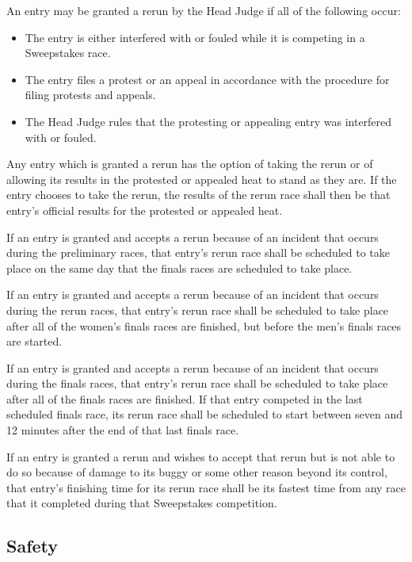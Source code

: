 	An entry may be granted a rerun by the Head Judge if all of the following occur:

	\begin{itemize}

		\item The entry is either interfered with or fouled while it is competing in a Sweepstakes race.

		\item The entry files a protest or an appeal in accordance with the procedure for filing protests and appeals.

		\item The Head Judge rules that the protesting or appealing entry was interfered with or fouled.

	\end{itemize}

	Any entry which is granted a rerun has the option of taking the rerun or of allowing its results in the protested or appealed heat to stand as they are. If the entry chooses to take the rerun, the results of the rerun race shall then be that entry's official results for the protested or appealed heat.

	If an entry is granted and accepts a rerun because of an incident that occurs during the preliminary races, that entry's rerun race shall be scheduled to take place on the same day that the finals races are scheduled to take place.

	If an entry is granted and accepts a rerun because of an incident that occurs during the rerun races, that entry's rerun race shall be scheduled to take place after all of the women's finals races are finished, but before the men's finals races are started.

	If an entry is granted and accepts a rerun because of an incident that occurs during the finals races, that entry's rerun race shall be scheduled to take place after all of the finals races are finished. If that entry competed in the last scheduled finals race, its rerun race shall be scheduled to start between seven and 12 minutes after the end of that last finals race.

	If an entry is granted a rerun and wishes to accept that rerun but is not able to do so because of damage to its buggy or some other reason beyond its control, that entry's finishing time for its rerun race shall be its fastest time from any race that it completed during that Sweepstakes competition.


\subsection{Safety}

